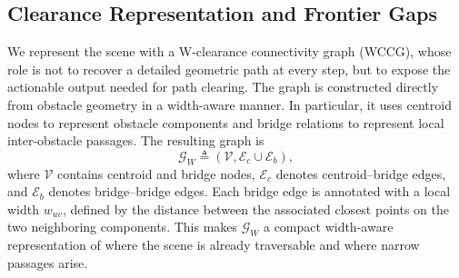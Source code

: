
\subsection{Clearance Representation and Frontier Gaps}
\label{subsec:frontier}

We represent the scene with a W-clearance connectivity graph (WCCG), whose role
is not to recover a detailed geometric path at every step, but to expose the
actionable output needed for path clearing. The graph is constructed directly
from obstacle geometry in a width-aware manner. In particular, it uses centroid
nodes to represent obstacle components and bridge relations to represent local
inter-obstacle passages. The resulting graph is
\begin{equation}
\mathcal{G}_W \triangleq (\mathcal{V}, \mathcal{E}_c \cup \mathcal{E}_b),
\end{equation}
where $\mathcal{V}$ contains centroid and bridge nodes, $\mathcal{E}_c$ denotes centroid--bridge
edges, and $\mathcal{E}_b$ denotes bridge--bridge edges. Each bridge edge is annotated
with a local width $w_{uv}$, defined by the distance between the associated
closest points on the two neighboring components. This makes $\mathcal{G}_W$ a compact
width-aware representation of where the scene is already traversable and where
narrow passages arise.

